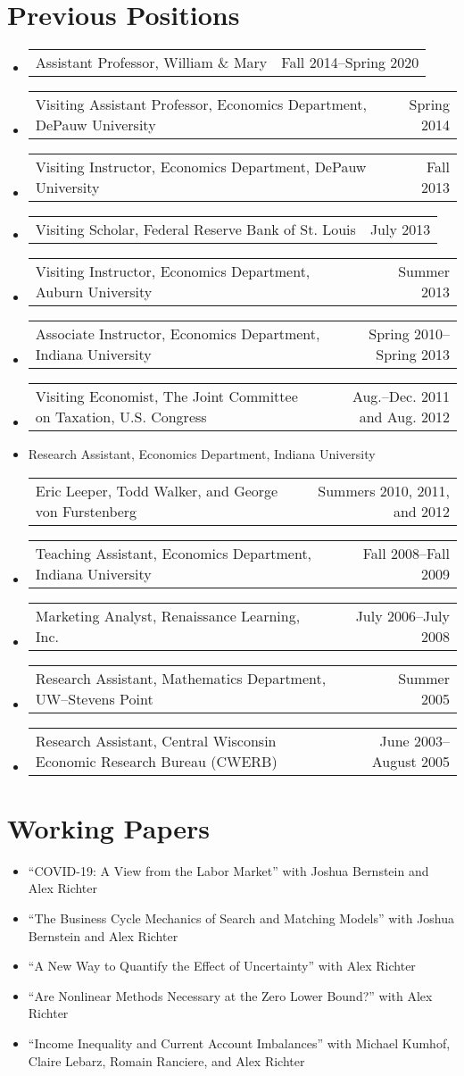 \documentclass[10pt,letterpaper,en-US]{article}
\makeatletter
\newcommand{\itemrow}[2]
{\begin{tabular*}{\linewidth}{l@{\extracolsep{\fill}}r}
	#1 & #2 \\
\end{tabular*}}
\makeatother
\begin{document}
\section*{Previous Positions}
\begin{itemize}\allowbreak
\item \itemrow{Assistant Professor, William \& Mary}{Fall 2014--Spring 2020}
\item \itemrow{Visiting Assistant Professor, Economics Department, DePauw University}{Spring 2014}
\item \itemrow{Visiting Instructor, Economics Department, DePauw University}{Fall 2013}
\item \itemrow{Visiting Scholar, Federal Reserve Bank of St. Louis}{July 2013}
\item \itemrow{Visiting Instructor, Economics Department, Auburn University}{Summer 2013}
\item \itemrow{Associate Instructor, Economics Department, Indiana University}{Spring 2010--Spring 2013}
\item \itemrow{Visiting Economist, The Joint Committee on Taxation, U.S. Congress}{Aug.--Dec. 2011 and Aug. 2012}
\item Research Assistant, Economics Department, Indiana University\\
        \itemrow{\hspace{.25in}Eric Leeper, Todd Walker, and George von Furstenberg}{Summers 2010, 2011, and 2012}
\item \itemrow{Teaching Assistant, Economics Department, Indiana University}{Fall 2008--Fall 2009}
\item \itemrow{Marketing Analyst, Renaissance Learning, Inc.}{July 2006--July 2008}
\item \itemrow{Research Assistant, Mathematics Department, UW--Stevens Point}{Summer 2005}
\item \itemrow{Research Assistant, Central Wisconsin Economic Research Bureau (CWERB)}{June 2003--August 2005}
\end{itemize}
\newpage

\section*{Working Papers}
\begin{itemize}
\item ``COVID-19: A View from the Labor Market'' with Joshua Bernstein and Alex Richter
\item ``The Business Cycle Mechanics of Search and Matching Models'' with Joshua Bernstein and Alex Richter
\item ``A New Way to Quantify the Effect of Uncertainty'' with Alex Richter
\item ``Are Nonlinear Methods Necessary at the Zero Lower Bound?'' with Alex Richter
\item ``Income Inequality and Current Account Imbalances'' with Michael Kumhof, Claire Lebarz, Romain Ranciere, and Alex Richter
\end{itemize}
\end{document}
